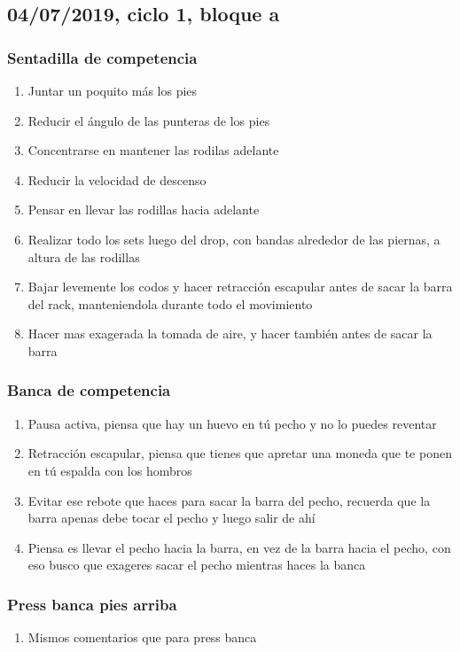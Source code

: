 \documentclass[11pt]{article}
\begin{document}
\subsection{04/07/2019, ciclo 1, bloque a}
\label{sec:org8870619}
\subsubsection{Sentadilla de competencia}
\label{sec:orgb995f1d}
\begin{enumerate}
\item Juntar un poquito más los pies
\item Reducir el ángulo de las punteras de los pies
\item Concentrarse en mantener las rodilas adelante
\item Reducir la velocidad de descenso
\item Pensar en llevar las rodillas hacia adelante
\item Realizar todo los sets luego del drop, con bandas alrededor de las
piernas, a altura de las rodillas
\item Bajar levemente los codos y hacer retracción escapular antes de
sacar la barra del rack, manteniendola durante todo el movimiento
\item Hacer mas exagerada la tomada de aire, y hacer también antes de
sacar la barra
\end{enumerate}
\subsubsection{Banca de competencia}
\label{sec:org3976495}
\begin{enumerate}
\item Pausa activa, piensa que hay un huevo en tú pecho y no lo puedes
reventar
\item Retracción escapular, piensa que tienes que apretar una moneda que
te ponen en tú espalda con los hombros
\item Evitar ese rebote que haces para sacar la barra del pecho, recuerda
que la barra apenas debe tocar el pecho y luego salir de ahí
\item Piensa es llevar el pecho hacia la barra, en vez de la barra hacia
el pecho, con eso busco que exageres sacar el pecho mientras haces
la banca
\end{enumerate}
\subsubsection{Press banca pies arriba}
\label{sec:orge99e216}
\begin{enumerate}
\item Mismos comentarios que para press banca
\end{enumerate}
\end{document}
